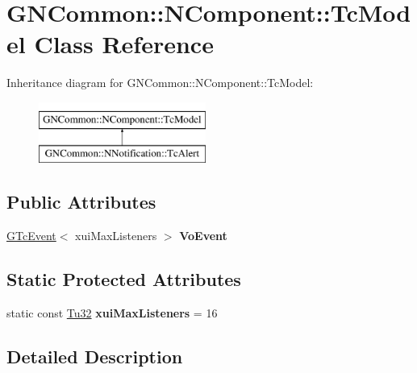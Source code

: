 \hypertarget{class_g_n_common_1_1_n_component_1_1_tc_model}{}\section{G\+N\+Common\+:\+:N\+Component\+:\+:Tc\+Model Class Reference}
\label{class_g_n_common_1_1_n_component_1_1_tc_model}
Inheritance diagram for G\+N\+Common\+:\+:N\+Component\+:\+:Tc\+Model\+:\begin{figure}[H]
\begin{center}
\leavevmode
\includegraphics[height=2.000000cm]{class_g_n_common_1_1_n_component_1_1_tc_model}
\end{center}
\end{figure}
\subsection*{Public Attributes}
\begin{DoxyCompactItemize}
\item 
\mbox{\label{class_g_n_common_1_1_n_component_1_1_tc_model_ad0a33b2b2478b257ef422db8120dde41}} 
\mbox{\hyperlink{class_g_n_common_1_1_n_component_1_1_g_tc_event}{G\+Tc\+Event}}$<$ xui\+Max\+Listeners $>$ {\bfseries Vo\+Event}
\end{DoxyCompactItemize}
\subsection*{Static Protected Attributes}
\begin{DoxyCompactItemize}
\item 
\mbox{\label{class_g_n_common_1_1_n_component_1_1_tc_model_a43cf22126d322790c5e15239ed00682a}} 
static const \mbox{\hyperlink{namespace_g_n_common_a941b527ef318f318aed7903dc832b7e4}{Tu32}} {\bfseries xui\+Max\+Listeners} = 16
\end{DoxyCompactItemize}


\subsection{Detailed Description}



